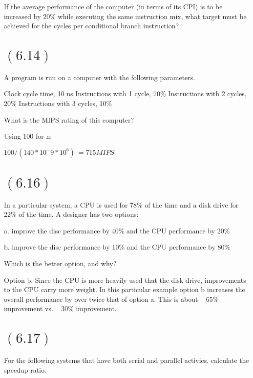 \documentclass[letterpaper,12pt,titlepage]{article}
\begin{document}
If the average performance of the computer (in terms of its CPI) is to be increased by 20\% while executing the same instruction mix, what target must be achieved for the cycles per conditional branch instruction?

\begin{mdframed}[style=MyFrame]
\end{mdframed}

\section*{$(6.14)$} A program is run on a computer with the following parameters.

Clock cycle time, 10 ns
Instructions with 1 cycle, 70\%
Instructions with 2 cycles, 20\%
Instructions with 3 cycles, 10\%

What is the MIPS rating of this computer?

\begin{mdframed}[style=MyFrame]

Using 100 for n:

$ 100 / (140 * 10^-9 * 10 ^ 6) ~= 715 MIPS $

\end{mdframed}

\section*{$(6.16)$} In a particular system, a CPU is used for 78\% of the time and a disk drive for 22\% of the time. A designer has two options:

a. improve the disc performance by 40\% and the CPU performance by 20\%

b. improve the disc performance by 10\% and the CPU performance by 80\%

Which is the better option, and why?

\begin{mdframed}[style=MyFrame]

Option b. Since the CPU is more heavily used that the disk drive, improvements to the CPU carry more weight. In this particular example option b increases the overall performance by over twice that of option a. This is about ~ 65\% improvement vs. ~ 30\% improvement.

\end{mdframed}

\section*{$(6.17)$} For the following systems that have both serial and parallel activies, calculate the speedup ratio.
\end{document}
